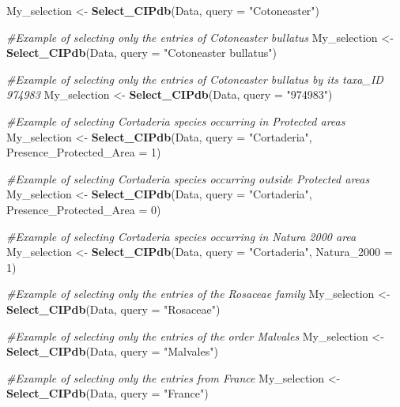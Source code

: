 \documentclass[
]{article}
\newenvironment{Shaded}{\begin{snugshade}}{\end{snugshade}}
\newcommand{\AttributeTok}[1]{\textcolor[rgb]{0.13,0.29,0.53}{#1}}
\newcommand{\CommentTok}[1]{\textcolor[rgb]{0.56,0.35,0.01}{\textit{#1}}}
\newcommand{\DecValTok}[1]{\textcolor[rgb]{0.00,0.00,0.81}{#1}}
\newcommand{\FunctionTok}[1]{\textcolor[rgb]{0.13,0.29,0.53}{\textbf{#1}}}
\newcommand{\NormalTok}[1]{#1}
\newcommand{\OtherTok}[1]{\textcolor[rgb]{0.56,0.35,0.01}{#1}}
\newcommand{\StringTok}[1]{\textcolor[rgb]{0.31,0.60,0.02}{#1}}
\begin{document}
\begin{Shaded}
\begin{Highlighting}[]
\NormalTok{My\_selection }\OtherTok{\textless{}{-}} \FunctionTok{Select\_CIPdb}\NormalTok{(Data, }\AttributeTok{query =} \StringTok{"Cotoneaster"}\NormalTok{)}

\CommentTok{\#Example of selecting only the entries of Cotoneaster bullatus}
\NormalTok{My\_selection }\OtherTok{\textless{}{-}} \FunctionTok{Select\_CIPdb}\NormalTok{(Data, }\AttributeTok{query =} \StringTok{"Cotoneaster bullatus"}\NormalTok{)}

\CommentTok{\#Example of selecting only the entries of Cotoneaster bullatus by its taxa\_ID 974983}
\NormalTok{My\_selection }\OtherTok{\textless{}{-}} \FunctionTok{Select\_CIPdb}\NormalTok{(Data, }\AttributeTok{query =} \StringTok{"974983"}\NormalTok{)}

\CommentTok{\#Example of selecting Cortaderia species occurring in Protected areas}
\NormalTok{My\_selection }\OtherTok{\textless{}{-}} \FunctionTok{Select\_CIPdb}\NormalTok{(Data, }\AttributeTok{query =} \StringTok{"Cortaderia"}\NormalTok{, }\AttributeTok{Presence\_Protected\_Area =} \DecValTok{1}\NormalTok{)}

\CommentTok{\#Example of selecting Cortaderia species occurring outside Protected areas}
\NormalTok{My\_selection }\OtherTok{\textless{}{-}} \FunctionTok{Select\_CIPdb}\NormalTok{(Data, }\AttributeTok{query =} \StringTok{"Cortaderia"}\NormalTok{, }\AttributeTok{Presence\_Protected\_Area =} \DecValTok{0}\NormalTok{)}

\CommentTok{\#Example of selecting Cortaderia species occurring in Natura 2000 area}
\NormalTok{My\_selection }\OtherTok{\textless{}{-}} \FunctionTok{Select\_CIPdb}\NormalTok{(Data, }\AttributeTok{query =} \StringTok{"Cortaderia"}\NormalTok{, }\AttributeTok{Natura\_2000 =} \DecValTok{1}\NormalTok{)}

\CommentTok{\#Example of selecting only the entries of the Rosaceae family}
\NormalTok{My\_selection }\OtherTok{\textless{}{-}} \FunctionTok{Select\_CIPdb}\NormalTok{(Data, }\AttributeTok{query =} \StringTok{"Rosaceae"}\NormalTok{)}

\CommentTok{\#Example of selecting only the entries of the order Malvales}
\NormalTok{My\_selection }\OtherTok{\textless{}{-}} \FunctionTok{Select\_CIPdb}\NormalTok{(Data, }\AttributeTok{query =}  \StringTok{"Malvales"}\NormalTok{)}

\CommentTok{\#Example of selecting only the entries from France}
\NormalTok{My\_selection }\OtherTok{\textless{}{-}} \FunctionTok{Select\_CIPdb}\NormalTok{(Data, }\AttributeTok{query =}  \StringTok{"France"}\NormalTok{)}


\end{Highlighting}
\end{Shaded}
\end{document}
